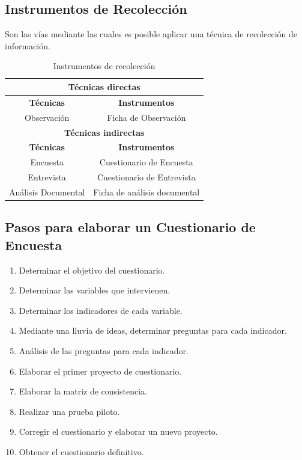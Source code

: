 \documentclass{article}
\begin{document}
    \subsection{Instrumentos de Recolección}
    Son las vías mediante las cuales es posible aplicar una técnica de recolección de información.

        \begin{table}[h!]
            \centering
            \begin{tabular}{|c|c|}
                \hline
                \multicolumn{2}{|c|}{\textbf{Técnicas directas}} \\\hline
                \textbf{Técnicas} & \textbf{Instrumentos} \\\hline
                Observación & Ficha de Observación \\\hline
                \multicolumn{2}{|c|}{\textbf{Técnicas indirectas}} \\\hline
                \textbf{Técnicas} & \textbf{Instrumentos} \\\hline
                Encuesta & Cuestionario de Encuesta \\\hline
                Entrevista & Cuestionario de Entrevista \\\hline
                Análisis Documental & Ficha de análisis documental \\\hline
            \end{tabular}
            \caption{Instrumentos de recolección}
        \end{table}

    \subsection{Pasos para elaborar un Cuestionario de Encuesta}
        \begin{enumerate}[label=\arabic*.]
        \item Determinar el objetivo del cuestionario.
        \item Determinar las variables que intervienen.
        \item Determinar los indicadores de cada variable.
        \item Mediante una lluvia de ideas, determinar preguntas para cada indicador.
        \item Análisis de las preguntas para cada indicador.
        \item Elaborar el primer proyecto de cuestionario.
        \item Elaborar la matriz de consistencia.
        \item Realizar una prueba piloto.
        \item Corregir el cuestionario y elaborar un nuevo proyecto.
        \item Obtener el cuestionario definitivo.
        \end{enumerate}
\end{document}
